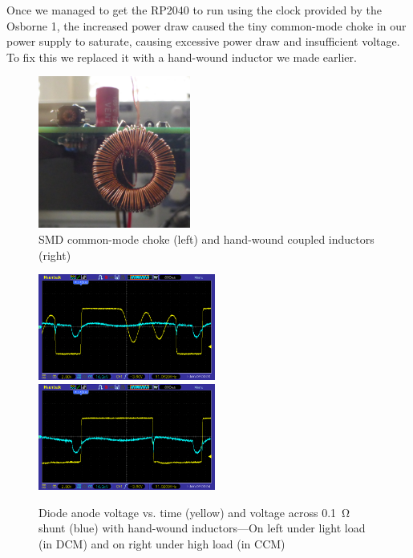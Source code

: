 \documentclass[a4paper]{article}
\begin{document}
Once we managed to get the RP2040 to run using the clock provided by
the Osborne 1, the increased power draw caused the tiny common-mode
choke in our power supply to saturate, causing excessive power draw
and insufficient voltage. To fix this we replaced it with a hand-wound
inductor we made earlier.

\begin{figure}
  \centering
  \includegraphics[height=5cm]{inductors}
  \caption[Inductors]{SMD common-mode choke (left) and hand-wound
    coupled inductors (right)}
\end{figure}

\begin{figure}
  \centering
  \includegraphics[height=3.5cm]{pic_25_1}\hfill\includegraphics[height=3.5cm]{pic_25_4}
  \caption[Voltage and current traces with handwound inductors]{Diode
    anode voltage vs. time (yellow) and voltage across \qty{0.1}{\ohm}
    shunt (blue) with hand-wound inductors---On left under light load (in
    DCM) and on right under high load (in CCM)}
\end{figure}
\end{document}
